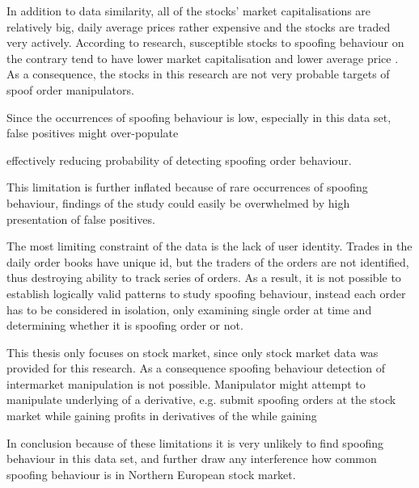 \documentclass{tut-thesis}
\begin{document}
In addition to data similarity, all of the stocks' market capitalisations are relatively big, daily average prices rather expensive and the stocks are traded very actively. According to research, susceptible stocks to spoofing behaviour on the contrary tend to have lower market capitalisation and lower average price \autocite{LeeEomPark2009, AggarwalWu2006, MeiWuZhou2004}. As a consequence, the stocks in this research are not very probable targets of spoof order manipulators. 

Since the occurrences of spoofing behaviour is low, especially in this data set, false positives might over-populate 

effectively reducing probability of detecting spoofing order behaviour.

This limitation is further inflated because of rare occurrences of spoofing behaviour, findings of the study could easily be overwhelmed by high presentation of false positives.

The most limiting constraint of the data is the lack of user identity. Trades in the daily order books have unique id, but the traders of the orders are not identified, thus destroying ability to track series of orders. As a result, it is not possible to establish logically valid patterns to study spoofing behaviour, instead each order has to be considered in isolation, only examining single order at time and determining whether it is spoofing order or not. 

This thesis only focuses on stock market, since only stock market data was provided for this research. As a consequence spoofing behaviour detection of intermarket manipulation is not possible. Manipulator might attempt to manipulate underlying of a derivative, e.g. submit spoofing orders at the stock market while gaining profits in derivatives of the  
while gaining 

In conclusion because of these limitations it is very unlikely to find spoofing behaviour in this data set, and further draw any interference how common spoofing behaviour is in Northern European stock market.  

\end{document}
